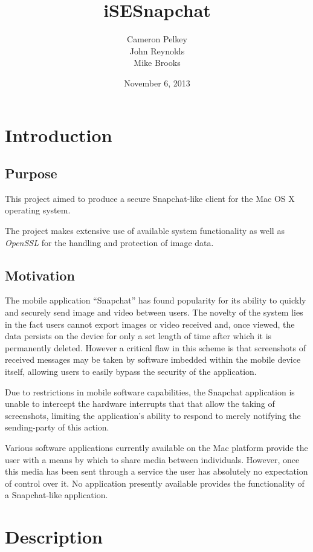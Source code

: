 \documentclass[11pt, a4paper,titlepage]{report}
\title{iSESnapchat}
\author{Cameron Pelkey\\John Reynolds\\Mike Brooks}
\date{November 6, 2013}
\begin{document}
\maketitle


\chapter{Introduction}
\section*{Purpose}
This project aimed to produce a secure Snapchat-like client for the Mac OS X operating system.

The project makes extensive use of available system functionality as well as \emph{OpenSSL} \cite{software:openssl} for the handling and protection of image data.

\section{Motivation}
The mobile application ``Snapchat'' has found popularity for its ability to quickly and securely send image and video between users. The novelty of the system lies in the fact users cannot export images or video received and, once viewed, the data persists on the device for only a set length of time after which it is permanently deleted. However a critical flaw in this scheme is that screenshots of received messages may be taken by software imbedded within the mobile device itself, allowing users to easily bypass the security of the application.

Due to restrictions in mobile software capabilities, the Snapchat application is unable to intercept the hardware interrupts that that allow the taking of screenshots, limiting the application's ability to respond to merely notifying the sending-party of this action.

Various software applications currently available on the Mac platform provide the user with a means by which to share media between individuals. However, once this media has been sent through a service the user has absolutely no expectation of control over it. No application presently available provides the functionality of a Snapchat-like application.


\chapter{Description}
\end{document}

